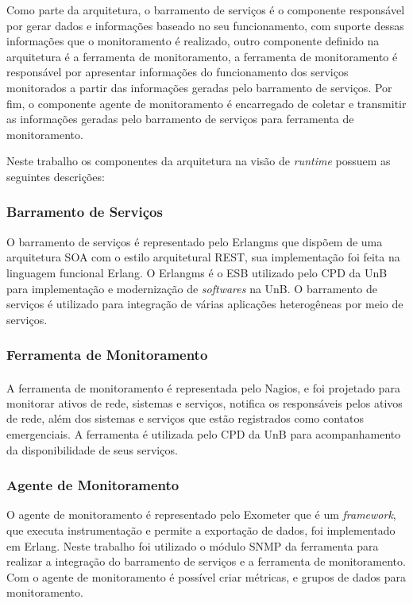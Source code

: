 Como parte da arquitetura, o barramento de serviços é o componente responsável por gerar dados e informações baseado no seu funcionamento, com suporte dessas informações que o monitoramento é realizado, outro componente definido na arquitetura é a ferramenta de monitoramento, a ferramenta de monitoramento é responsável por apresentar informações do funcionamento dos serviços monitorados a partir das informações geradas pelo barramento de serviços. Por fim, o componente agente de monitoramento é encarregado de coletar e transmitir as informações geradas pelo barramento de serviços para ferramenta de monitoramento.  

Neste trabalho os componentes da arquitetura na visão de \textit{runtime}\cite{clements2002documenting} possuem as seguintes descrições:

\subsubsection{Barramento de Serviços}
O barramento de serviços é representado pelo Erlangms que dispõem de uma arquitetura SOA com o estilo arquitetural REST, sua implementação foi feita na linguagem funcional Erlang. O Erlangms é o \acrshort{ESB} utilizado pelo \acrshort{CPD} da \acrshort{UnB} para implementação e modernização de \textit{softwares} na \acrshort{UnB}. O barramento de serviços é utilizado para integração de várias aplicações heterogêneas por meio de serviços.

\subsubsection{Ferramenta de Monitoramento}
A ferramenta de monitoramento é representada pelo Nagios\textsuperscript{\textregistered}, e foi projetado para monitorar ativos de rede, sistemas e serviços, notifica os responsáveis pelos ativos de rede, além dos sistemas e serviços que estão registrados como contatos emergenciais. A ferramenta é utilizada pelo \acrshort{CPD} da \acrshort{UnB} para acompanhamento da  disponibilidade de seus serviços.

\subsubsection{Agente de Monitoramento}
O agente de monitoramento é representado pelo Exometer que é um \textit{framework}, que executa instrumentação e permite a exportação de dados, foi implementado em Erlang. Neste trabalho foi utilizado o módulo SNMP da ferramenta para realizar a integração do barramento de serviços e a ferramenta de monitoramento. Com o agente de monitoramento é possível criar métricas, e grupos de dados para monitoramento.

